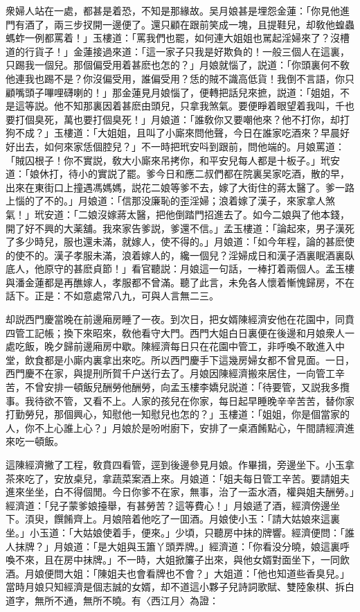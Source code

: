衆婦人站在一處，都甚是着恐，不知是那緣故。吴月娘甚是埋怨金蓮：「你見他進門有酒了，兩三步扠開一邊便了。還只顧在跟前笑成一塊，且提鞋兒，却敎他蝗蟲螞蚱一例都罵着！」玉樓道：「罵我們也罷，如何連大姐姐也駡起淫婦來了？沒槽道的行貨子！」金蓮接過來道：「這一家子只我是好欺負的！一般三個人在這裏，只踢我一個兒。那個偏受用着甚麽也怎的？」月娘就惱了，説道：「你頭裏何不敎他連我也踢不是？你沒偏受用，誰偏受用？恁的賊不識高低貨！我倒不言語，你只顧嘴頭子嗶哩礴喇的！」那金蓮見月娘惱了，便轉把話兒來摭，説道：「姐姐，不是這等説。他不知那裏因着甚麽由頭兒，只拿我煞氣。要便睜着眼望着我叫，千也要打個臭死，萬也要打個臭死！」月娘道：「誰敎你又要嘲他來？他不打你，却打狗不成？」玉樓道：「大姐姐，且叫了小廝來問他聲，今日在誰家吃酒來？早晨好好出去，如何來家恁個腔兒？」不一時把玳安呌到跟前，問他端的。月娘罵道：「賊囚根子！你不實説，敎大小廝來吊拷你，和平安兒每人都是十板子。」玳安道：「娘休打，待小的實説了罷。爹今日和應二叔們都在院裏吴家吃酒，散的早，出來在東街口上撞遇馮媽媽，説花二娘等爹不去，嫁了大街住的蔣太醫了。爹一路上惱的了不的。」月娘道：「信那没廉恥的歪淫婦；浪着嫁了漢子，來家拿人煞氣！」玳安道：「二娘沒嫁蔣太醫，把他倒踏門招進去了。如今二娘與了他本錢，開了好不興的大薬舖。我來家告爹説，爹還不信。」孟玉樓道：「論起來，男子漢死了多少時兒，服也還未滿，就嫁人，使不得的。」月娘道：「如今年程，論的甚麽使的使不的。漢子孝服未滿，浪着嫁人的，纔一個兒？淫婦成日和漢子酒裏眠酒裏臥底人，他原守的甚麽貞節！」看官聽説：月娘這一句話，一棒打着兩個人。孟玉樓與潘金蓮都是再醮嫁人，孝服都不曾滿。聽了此言，未免各人懷着慚愧歸房，不在話下。正是：不如意處常八九，可與人言無二三。

却説西門慶當晚在前邊廂房睡了一夜。到次日，把女婿陳經濟安他在花園中，同賁四管工記帳；換下來昭來，敎他看守大門。西門大姐白日裏便在後邊和月娘衆人一處吃飯，晚夕歸前邊廂房中歇。陳經濟每日只在花園中管工，非呼喚不敢進入中堂，飲食都是小廝内裏拿出來吃。所以西門慶手下這幾房婦女都不曾見面。一日，西門慶不在家，與提刑所賀千户送行去了。月娘因陳經濟搬來居住，一向管工辛苦，不曾安排一頓飯兒酬勞他酬勞，向孟玉樓李嬌兒説道：「待要管，又説我多攬事。我待欲不管，又看不上。人家的孩兒在你家，每日起早睡晚辛辛苦苦，替你家打勤勞兒，那個興心，知慰他一知慰兒也怎的？」玉樓道：「姐姐，你是個當家的人，你不上心誰上心？」月娘於是吩咐廚下，安排了一桌酒餚點心，午間請經濟進來吃一頓飯。

這陳經濟撇了工程，敎賁四看管，逕到後邊參見月娘。作畢揖，旁邊坐下。小玉拿茶來吃了，安放桌兒，拿蔬菜案酒上來。月娘道：「姐夫每日管工辛苦。要請姐夫進來坐坐，白不得個閒。今日你爹不在家，無事，治了一盃水酒，權與姐夫酬勞。」經濟道：「兒子蒙爹娘擡舉，有甚勞苦？這等費心！」月娘遞了酒，經濟傍邊坐下。湏臾，饌餚齊上。月娘陪着他吃了一囬酒。月娘使小玉：「請大姑娘來這裏坐。」小玉道：「大姑娘使着手，便來。」少頃，只聽房中抹的牌響。經濟便問：「誰人抹牌？」月娘道：「是大姐與玉簫丫頭弄牌。」經濟道：「你看没分曉，娘這裏呼喚不來，且在房中抹牌。」不一時，大姐掀簾子出來，與他女婿對面坐下，一同飲酒。月娘便問大姐：「陳姐夫也會看牌也不會？」大姐道：「他也知道些香臭兒。」當時月娘只知經濟是個志誠的女婿，却不道這小夥子兒詩詞歌賦、雙陸象棋、拆白道字，無所不通，無所不曉。有〈西江月〉為證：

